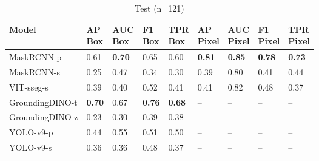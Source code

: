 \begin{table*}[t]
  \hfill %

    \begin{subtable}[b]{\textwidth} %
    \caption{Test (n=121)}
    \centering
        \begin{tabular}{lllllllll}
        \toprule
         Model      & \makecell{AP\\Box}   & \makecell{AUC\\Box}   & \makecell{F1\\Box}   & \makecell{TPR\\Box}   & \makecell{AP\\Pixel}   & \makecell{AUC\\Pixel}   & \makecell{F1\\Pixel}   & \makecell{TPR\\Pixel}     \\
        \midrule
         MaskRCNN-p      & 0.61          & \textbf{0.70} & 0.65          & 0.60          & \textbf{0.81} & \textbf{0.85} & \textbf{0.78} & \textbf{0.73} \\
         MaskRCNN-s      & 0.25          & 0.47          & 0.34          & 0.30          & 0.39          & 0.80          & 0.41          & 0.44          \\
         VIT-sseg-s      & 0.39          & 0.40          & 0.52          & 0.41          & 0.41          & 0.82          & 0.48          & 0.37          \\
         GroundingDINO-t & \textbf{0.70} & 0.67          & \textbf{0.76} & \textbf{0.68} & --            & --            & --            & --            \\
         GroundingDINO-z & 0.23          & 0.30          & 0.39          & 0.38          & --            & --            & --            & --            \\
         YOLO-v9-p       & 0.44          & 0.55          & 0.51          & 0.50          & --            & --            & --            & --            \\
         YOLO-v9-s       & 0.36          & 0.36          & 0.48          & 0.37          & --            & --            & --            & --            \\
        \bottomrule
        \end{tabular}
    \end{subtable}

\ifwacv \ResultCaption \fi
\end{table*}

